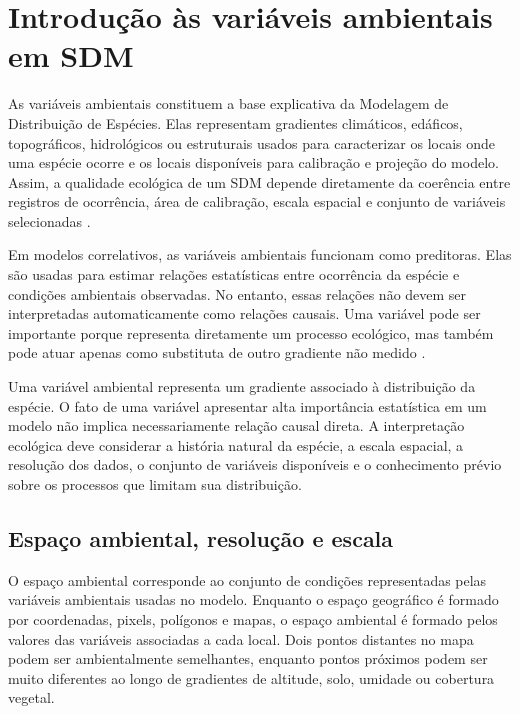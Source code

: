 \documentclass{ueap-sdm}
\begin{document}
\section{Introdução às variáveis ambientais em SDM}

As variáveis ambientais constituem a base explicativa da Modelagem de Distribuição de Espécies. Elas representam gradientes climáticos, edáficos, topográficos, hidrológicos ou estruturais usados para caracterizar os locais onde uma espécie ocorre e os locais disponíveis para calibração e projeção do modelo. Assim, a qualidade ecológica de um SDM depende diretamente da coerência entre registros de ocorrência, área de calibração, escala espacial e conjunto de variáveis selecionadas \parencite{guisan2005predicting,elith2009,guisan2017habitat}.

Em modelos correlativos, as variáveis ambientais funcionam como preditoras. Elas são usadas para estimar relações estatísticas entre ocorrência da espécie e condições ambientais observadas. No entanto, essas relações não devem ser interpretadas automaticamente como relações causais. Uma variável pode ser importante porque representa diretamente um processo ecológico, mas também pode atuar apenas como substituta de outro gradiente não medido \parencite{franklin2010,guisan2017habitat}.

\begin{conceito}[title={\faBook\quad Variável ambiental não é necessariamente mecanismo ecológico}]
	Uma variável ambiental representa um gradiente associado à distribuição da espécie. O fato de uma variável apresentar alta importância estatística em um modelo não implica necessariamente relação causal direta. A interpretação ecológica deve considerar a história natural da espécie, a escala espacial, a resolução dos dados, o conjunto de variáveis disponíveis e o conhecimento prévio sobre os processos que limitam sua distribuição.
\end{conceito}

\subsection{Espaço ambiental, resolução e escala}

O espaço ambiental corresponde ao conjunto de condições representadas pelas variáveis ambientais usadas no modelo. Enquanto o espaço geográfico é formado por coordenadas, pixels, polígonos e mapas, o espaço ambiental é formado pelos valores das variáveis associadas a cada local. Dois pontos distantes no mapa podem ser ambientalmente semelhantes, enquanto pontos próximos podem ser muito diferentes ao longo de gradientes de altitude, solo, umidade ou cobertura vegetal.
\end{document}
